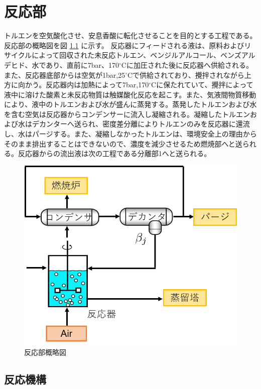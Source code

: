 \documentclass[a4j]{jsreport}
\begin{document}
\newpage
\chapter{反応部}
トルエンを空気酸化させ、安息香酸に転化させることを目的とする工程である。
反応部の概略図を図 \ref{反応部設計結果の概略図} に示す。
反応器にフィードされる液は、原料およびリサイクルによって回収された未反応トルエン、ベンジルアルコール、ベンズアルデヒド、水であり、直前に7bar、170$^\circ$Cに加圧された後に反応器へ供給される。また、反応器底部からは空気が1bar,25$^\circ$Cで供給されており、攪拌されながら上方に向かう。反応器内は加熱によって7bar,170$^\circ$Cに保たれていて、攪拌によって液中に溶けた酸素と未反応物質は触媒酸化反応を起こす。また、気液間物質移動により、液中のトルエンおよび水が盛んに蒸発する。蒸発したトルエンおよび水を含む空気は反応器からコンデンサーに流入し凝縮される。凝縮したトルエンおよび水はデカンターへ送られ、密度差分離によりトルエンのみを反応器に還流し、水はパージする。また、凝縮しなかったトルエンは、環境安全上の理由からそのまま排出することはできないので、濃度を減少させるため燃焼部へと送られる。反応器からの流出液は次の工程である分離部1へと送られる。
\begin{figure}[h]
    \begin{center}
        \includegraphics[scale=0.7]{ReactionSection.png}
        \caption{反応部概略図}
        \label{反応部設計結果の概略図}
    \end{center}
\end{figure}

\section{反応機構}
\end{document}
